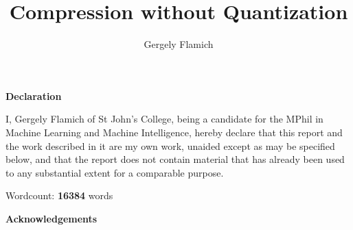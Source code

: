 \documentclass{article}
\title{Compression without Quantization}
\author{Gergely Flamich}
\begin{document}


%
%

\vspace{2cm}

\begin{center}
\Huge
\textbf{Declaration}
\end{center}

\vspace{1cm}

\large
\noindent I, Gergely Flamich of St John's College, being a candidate for the
MPhil in Machine Learning and Machine Intelligence, hereby declare that this
report and the work described in it are my own work, unaided except as may be
specified below, and that the report does not contain material that has
already been used to any substantial extent for a comparable purpose.


\vspace{2cm}

\large
\noindent
Wordcount: \textbf{16384} words

\newpage

%
%

\vspace{2cm}

\begin{center}
\Huge
\textbf{Acknowledgements}
\end{center}

\vspace{1cm}



\newpage

%
%

\begin{abstract}
\end{abstract}

\newpage

\tableofcontents

\newpage

%
%
\end{document}
